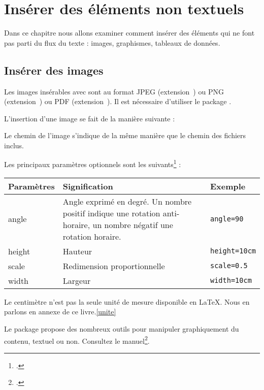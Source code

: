 \chapter{Insérer des éléments non textuels}

\begin{prealable}
    Dans ce chapitre nous allons examiner comment insérer des éléments qui ne font pas parti du flux du texte : images, graphismes, tableaux de données.
\end{prealable}

\section{Insérer des images}

Les images insérables avec \XeLaTeX sont au format JPEG (extension~) ou PNG (extension~) ou PDF (extension~). Il est nécessaire d'utiliser le package .


L'insertion d'une image se fait de la manière suivante : 

Le chemin de l'image s'indique de la même manière que le chemin des fichiers inclus.

Les principaux paramètres optionnels sont les suivants\footcite[Pour les autres, on consulter][]{graphicx_options} :

\begin{longtable}{|p{7em}|p{14em}|p{7em}|}
    \hline
    Paramètres & Signification & Exemple    \\
    \hline
    \endhead
    \hline
    \endfoot
    angle        & Angle exprimé en degré. Un nombre positif indique une rotation anti-horaire, un nombre négatif une rotation horaire.     & \verb|angle=90| \\
    height        & Hauteur    & \verb|height=10cm|     \\
    scale        & Redimension proportionnelle & \verb|scale=0.5|\\
    width        & Largeur     & \verb|width=10cm|     \\
\end{longtable}

\begin{plusloins}
Le centimètre n'est pas la seule  unité de mesure disponible en \LaTeX. Nous en parlons en annexe de ce livre.\ref{unite}
\end{plusloins}

\begin{plusloins}
Le package  propose des nombreux outils pour manipuler graphiquement du contenu, textuel ou non. Consultez le manuel\footcite{graphicx}.
\end{plusloins}

